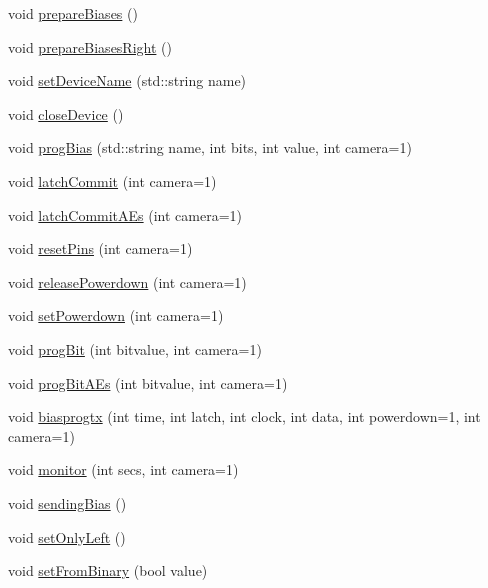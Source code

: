 \begin{DoxyCompactItemize}
\item 
void \hyperlink{classdevice2yarp_afbcd3cc36aeda39c389037ff480a0c3a}{prepare\+Biases} ()
\item 
void \hyperlink{classdevice2yarp_ab103ad6beed47415371ec71cc2ac30c3}{prepare\+Biases\+Right} ()
\item 
void \hyperlink{classdevice2yarp_aaaff6edb1a3d7830d6e87b14226e9207}{set\+Device\+Name} (std\+::string name)
\item 
void \hyperlink{classdevice2yarp_af60c47d12785c8bbc8ffb0a29f740a97}{close\+Device} ()
\item 
void \hyperlink{classdevice2yarp_a2ad1d6367e70bbc19d163b80a959843b}{prog\+Bias} (std\+::string name, int bits, int value, int camera=1)
\item 
void \hyperlink{classdevice2yarp_a148575c0588c481968e8e1c89aa1b2d8}{latch\+Commit} (int camera=1)
\item 
void \hyperlink{classdevice2yarp_ad5db8d09f97eb010e8037de3aafe4c0c}{latch\+Commit\+A\+Es} (int camera=1)
\item 
void \hyperlink{classdevice2yarp_a5227cd9f8f77fc3282abdb4f067c72db}{reset\+Pins} (int camera=1)
\item 
void \hyperlink{classdevice2yarp_acd91e6286807878481a293929579a358}{release\+Powerdown} (int camera=1)
\item 
void \hyperlink{classdevice2yarp_a468ec9658d04b2c89ea383a398245279}{set\+Powerdown} (int camera=1)
\item 
void \hyperlink{classdevice2yarp_a65726cde64ea739945753f5b51e84d8b}{prog\+Bit} (int bitvalue, int camera=1)
\item 
void \hyperlink{classdevice2yarp_a5291edc3d845bc6dd35c6d1a783ea80c}{prog\+Bit\+A\+Es} (int bitvalue, int camera=1)
\item 
void \hyperlink{classdevice2yarp_a39c03e4a4e0ac4b891947b872974f8af}{biasprogtx} (int time, int latch, int clock, int data, int powerdown=1, int camera=1)
\item 
void \hyperlink{classdevice2yarp_a19c60dd42e00da0e717da9fe17a5b2f5}{monitor} (int secs, int camera=1)
\item 
void \hyperlink{classdevice2yarp_a300aab882d64fa1a51b2058b530c8093}{sending\+Bias} ()
\item 
void \hyperlink{classdevice2yarp_a704565be367fa28840df912a97bdc25a}{set\+Only\+Left} ()
\item 
void \hyperlink{classdevice2yarp_a94653e9e8ce5ac4a60ae920f0ee41ee6}{set\+From\+Binary} (bool value)
\item 

\end{DoxyCompactItemize}
